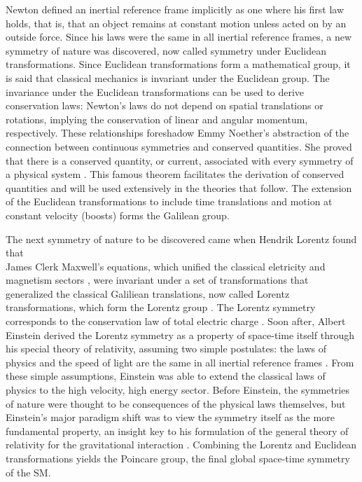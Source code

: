 \indent Newton defined an inertial reference frame implicitly as one where his first law holds, that is, that an object remains at constant motion unless acted on by an outside force. Since his laws were the same in all inertial reference frames, a new symmetry of nature was discovered, now called symmetry under Euclidean transformations. Since Euclidean transformations form a mathematical group, it is said that classical mechanics is invariant under the Euclidean group. The invariance under the Euclidean transformations can be used to derive conservation laws: Newton's laws do not depend on spatial translations or rotations, implying the conservation of linear and angular momentum, respectively. These relationships foreshadow Emmy Noether's abstraction of the connection between continuous symmetries and conserved quantities. She proved that there is a conserved quantity, or current, associated with every symmetry of a physical system \cite{Noether:1918zz}. This famous theorem facilitates the derivation of conserved quantities and will be used extensively in the theories that follow. The extension of the Euclidean transformations to include time translations and motion at constant velocity (boosts) forms the Galilean group.

\indent The next symmetry of nature to be discovered came when Hendrik Lorentz found that \\
James Clerk Maxwell's equations, which unified the classical eletricity and magnetism sectors \cite{Maxwell01011865}, were invariant under a set of transformations that generalized the classical Galiliean translations, now called Lorentz transformations, which form the Lorentz group \cite{Lorentz}. The Lorentz symmetry corresponds to the conservation law of total electric charge \cite{Noether:1918zz2}. Soon after, Albert Einstein derived the Lorentz symmetry as a property of space-time itself through his special theory of relativity, assuming two simple postulates: the laws of physics and the speed of light are the same in all inertial reference frames \cite{Einstein:1905ve}. From these simple assumptions, Einstein was able to extend the classical laws of physics to the high velocity, high energy sector. Before Einstein, the symmetries of nature were thought to be consequences of the physical laws themselves, but Einstein's major paradigm shift was to view the symmetry itself as the more fundamental property, an insight key to his formulation of the general theory of relativity for the gravitational interaction \cite{Einstein:1914bt}. Combining the Lorentz and Euclidean transformations yields the Poincare group, the final global space-time symmetry of the SM.

